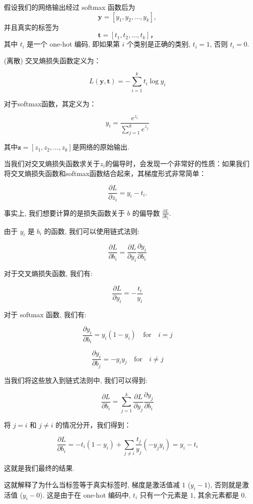 \documentclass{ctexart}
\begin{document}
假设我们的网络输出经过 softmax 函数后为
$$
    \mathbf{y} = [y_1, y_2, \ldots, y_k],
$$
并且真实的标签为
$$
    \mathbf{t} = [t_1, t_2, \ldots, t_k]，
$$
其中 $t_i$ 是一个 one-hot 编码, 即如果第 $i$ 个类别是正确的类别, $t_i = 1$, 否则 $t_i = 0$.

(离散) 交叉熵损失函数定义为：

$$
    L(\mathbf{y}, \mathbf{t}) = - \sum_{i=1}^{k} t_i \log y_i
$$

对于softmax函数，其定义为：

$$
    y_i = \frac{e^{z_i}}{\sum_{j=1}^{k} e^{z_j}}
$$

其中$\mathbf{z} = [z_1, z_2, \ldots, z_k]$是网络的原始输出.

当我们对交叉熵损失函数求关于$z_i$的偏导时，会发现一个非常好的性质：如果我们将交叉熵损失函数和softmax函数结合起来，其梯度形式非常简单：

$$
    \frac{\partial L}{\partial z_i} = y_i - t_i.
$$

事实上, 我们想要计算的是损失函数关于 $b$ 的偏导数 $\frac{\partial L}{\partial b_i}$.

由于 $y_i$ 是 $b_i$ 的函数, 我们可以使用链式法则:

$$
    \frac{\partial L}{\partial b_i} = \frac{\partial L}{\partial y_i} \frac{\partial y_i}{\partial b_i}
$$

对于交叉熵损失函数, 我们有:

$$
    \frac{\partial L}{\partial y_i} = - \frac{t_i}{y_i}
$$

对于 softmax 函数, 我们有:

$$
    \frac{\partial y_i}{\partial b_i} = y_i (1 - y_i) \quad \text{for} \quad i = j
$$

$$
    \frac{\partial y_i}{\partial b_j} = - y_i y_j \quad \text{for} \quad i \neq j
$$

当我们将这些放入到链式法则中, 我们可以得到:

$$
    \frac{\partial L}{\partial b_i} = \sum_{j=1}^{k} \frac{\partial L}{\partial y_j} \frac{\partial y_j}{\partial b_i}
$$

将 $j = i$ 和 $j \neq i$ 的情况分开，我们得到：

$$
    \frac{\partial L}{\partial b_i} = - t_i (1 - y_i) + \sum_{j \neq i} \frac{t_j}{y_j} (- y_j y_i) = y_i - t_i
$$

这就是我们最终的结果.

这就解释了为什么当标签等于真实标签时, 梯度是激活值减 $1$ ($y_i - 1$), 否则就是激活值 ($y_i - 0$).
这是由于在 one-hot 编码中, $t_i$ 只有一个元素是 $1$, 其余元素都是 $0$.
\end{document}

